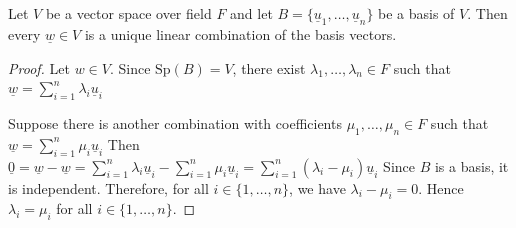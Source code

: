 \begin{theorem}\label{thm:unique-representation}
    Let $V$ be a vector space over field $F$ and let $B = \{\underline{u}_1, \ldots, \underline{u}_n\}$ be a basis of $V$. Then every $\underline{w} \in V$ is a unique linear combination of the basis vectors.
\end{theorem}

\begin{proof}
    Let $w \in V$. Since $\mathrm{Sp}(B) = V$, there exist $\lambda_1, \ldots, \lambda_n \in F$ such that
    $\underline{w} = \sum_{i=1}^{n} \lambda_i \underline{u}_i$
    
    Suppose there is another combination with coefficients $\mu_1, \ldots, \mu_n \in F$ such that
    $\underline{w} = \sum_{i=1}^{n} \mu_i \underline{u}_i$
    Then
    $\underline{0} = \underline{w} - \underline{w} = \sum_{i=1}^{n} \lambda_i \underline{u}_i - \sum_{i=1}^{n} \mu_i \underline{u}_i = \sum_{i=1}^{n} (\lambda_i - \mu_i) \underline{u}_i$
    Since $B$ is a basis, it is independent. Therefore, for all $i \in \{1, \ldots, n\}$, we have $\lambda_i - \mu_i = 0$. Hence $\lambda_i = \mu_i$ for all $i \in \{1, \ldots, n\}$.
\end{proof}